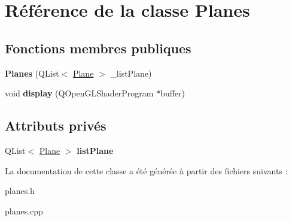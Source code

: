 \hypertarget{classPlanes}{}\section{Référence de la classe Planes}
\label{classPlanes}
\subsection*{Fonctions membres publiques}
\begin{DoxyCompactItemize}
\item 
\mbox{\label{classPlanes_acac2b23c7cc97869e524b88cafec5cbf}} 
{\bfseries Planes} (Q\+List$<$ \hyperlink{classPlane}{Plane} $>$ \+\_\+list\+Plane)
\item 
\mbox{\label{classPlanes_a564c997f6e0e6b66f77a3fbfc29790c0}} 
void {\bfseries display} (Q\+Open\+G\+L\+Shader\+Program $\ast$buffer)
\end{DoxyCompactItemize}
\subsection*{Attributs privés}
\begin{DoxyCompactItemize}
\item 
\mbox{\label{classPlanes_aff3c3ed8edc2af512dbad7f2921f39d1}} 
Q\+List$<$ \hyperlink{classPlane}{Plane} $>$ {\bfseries list\+Plane}
\end{DoxyCompactItemize}


La documentation de cette classe a été générée à partir des fichiers suivants \+:\begin{DoxyCompactItemize}
\item 
planes.\+h\item 
planes.\+cpp\end{DoxyCompactItemize}
